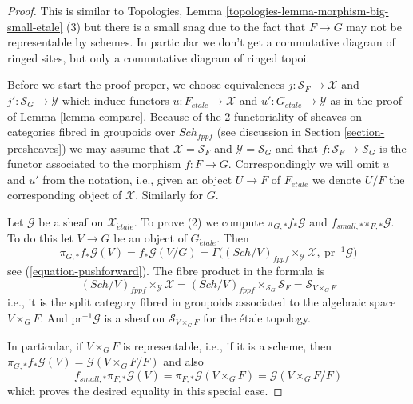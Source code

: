 \documentclass[10pt,a4paper]{amsart}
\theoremstyle{plain}
\theoremstyle{definition}
\theoremstyle{remark}
\numberwithin{equation}{subsection}
\def\Sch{\mathit{Sch}}
\def\etale{{\acute{e}tale}}
\begin{document}
\begin{proof}
This is similar to
Topologies, Lemma \ref{topologies-lemma-morphism-big-small-etale} (3)
but there is a small snag due to the fact that $F \to G$ may not be
representable by schemes. In particular we don't get a commutative diagram
of ringed sites, but only a commutative diagram of ringed topoi.

\medskip\noindent
Before we start the proof proper, we choose equivalences
$j : \mathcal{S}_F \to \mathcal{X}$ and
$j' : \mathcal{S}_G \to \mathcal{Y}$ which induce functors
$u : F_\etale \to \mathcal{X}$ and
$u' : G_\etale \to \mathcal{Y}$ as in the proof of
Lemma \ref{lemma-compare}. Because of the 2-functoriality of
sheaves on categories fibred in groupoids over $\Sch_{fppf}$
(see discussion in Section \ref{section-presheaves})
we may assume that $\mathcal{X} = \mathcal{S}_F$ and
$\mathcal{Y} = \mathcal{S}_G$ and that $f : \mathcal{S}_F \to \mathcal{S}_G$
is the functor associated to the morphism $f : F \to G$. Correspondingly
we will omit $u$ and $u'$ from the notation, i.e., given an object
$U \to F$ of $F_\etale$ we denote $U/F$
the corresponding object of $\mathcal{X}$. Similarly for $G$.

\medskip\noindent
Let $\mathcal{G}$ be a sheaf on $\mathcal{X}_\etale$.
To prove (2) we compute $\pi_{G, *}f_*\mathcal{G}$ and
$f_{small, *}\pi_{F, *}\mathcal{G}$. To do this let $V \to G$ be an object
of $G_\etale$. Then
$$
\pi_{G, *}f_*\mathcal{G}(V) = f_*\mathcal{G}(V/G) =
\Gamma\Big(
(\Sch/V)_{fppf} \times_{\mathcal{Y}} \mathcal{X},
\ \text{pr}^{-1}\mathcal{G}\Big)
$$
see (\ref{equation-pushforward}). The fibre product in the formula is
$$
(\Sch/V)_{fppf} \times_{\mathcal{Y}} \mathcal{X} =
(\Sch/V)_{fppf} \times_{\mathcal{S}_G} \mathcal{S}_F =
\mathcal{S}_{V \times_G F}
$$
i.e., it is the split category fibred in groupoids associated to the
algebraic space $V \times_G F$. And $\text{pr}^{-1}\mathcal{G}$ is a
sheaf on $\mathcal{S}_{V \times_G F}$ for the \'etale topology.

\medskip\noindent
In particular, if $V \times_G F$ is representable, i.e., if it is a scheme,
then $\pi_{G, *}f_*\mathcal{G}(V) = \mathcal{G}(V \times_G F/F)$ and
also
$$
f_{small, *}\pi_{F, *}\mathcal{G}(V) =
\pi_{F, *}\mathcal{G}(V \times_G F) =
\mathcal{G}(V \times_G F/F)
$$
which proves the desired equality in this special case.


\end{proof}
\end{document}
